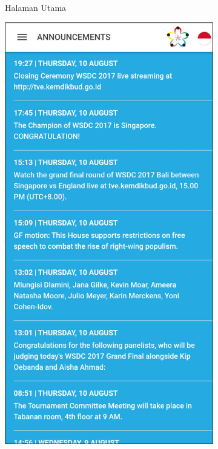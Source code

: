 \begin{figure}[H]
\begin{subfigure}[b]{0.3\textwidth}
    \caption{Halaman Utama}
    \label{fig:wsdcapp}
     \end{subfigure}
     \hfill
     \begin{subfigure}[b]{0.3\textwidth}
    \centering
	    \includegraphics[scale=0.4]{Gambar/AnnouncementsPage.png}

\end{subfigure}
\end{figure}
